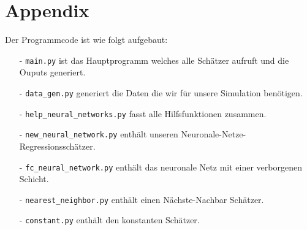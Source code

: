 \chapter*{Appendix}
\label{chap:app}

Der Programmcode ist wie folgt aufgebaut:
\begin{itemize}
    \item[-] \texttt{main.py} ist das Hauptprogramm welches alle Schätzer aufruft und die Ouputs generiert.
    \item[-] \texttt{data\_gen.py} generiert die Daten die wir für unsere Simulation benötigen.
    \item[-] \texttt{help\_neural\_networks.py} fasst alle Hilfsfunktionen zusammen.
    \item[-] \texttt{new\_neural\_network.py} enthält unseren Neuronale-Netze-Regressionsschätzer.
    \item[-] \texttt{fc\_neural\_network.py} enthält das neuronale Netz mit einer verborgenen Schicht.
    \item[-] \texttt{nearest\_neighbor.py} enthält einen Nächste-Nachbar Schätzer.
    \item[-] \texttt{constant.py} enthält den konstanten Schätzer.
\end{itemize}
\renewcommand\lstlistingname{Listing}






